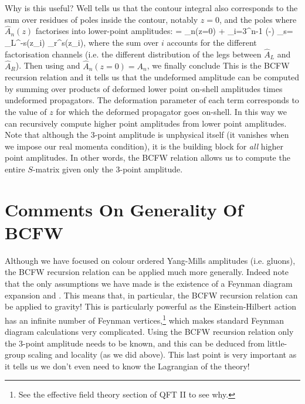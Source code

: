 Why is this useful? Well  tells us that the contour integral also corresponds to the sum over residues of poles inside the contour, notably $z=0$, and the poles where $\widehat{A}_n(z)$ factorises into lower-point amplitudes:
 = _n(z=0) + \sum_{i=3}^{n-1}  \bigg(-\bigg) \sum_{s=} _L^{-s}(z_i) _r^s(z_i),
\ese 
where the sum over $i$ accounts for the different factorisation channels (i.e. the different distribution of the legs between $\widehat{A}_L$ and $\widehat{A}_R$). Then using  and $\widehat{A}_n(z=0) = A_n$, we finally conclude 
\noindent This is the BCFW recursion relation and it tells us that the undeformed amplitude can be computed by summing over products of deformed lower point on-shell amplitudes times undeformed propagators. The deformation parameter of each term corresponds to the value of $z$ for which the deformed propagator goes on-shell. In this way we can recursively compute higher point amplitudes from lower point amplitudes. Note that although the $3$-point amplitude is unphysical itself (it vanishes when we impose our real momenta condition), it is the building block for \textit{all} higher point amplitudes. In other words, the BCFW relation allows us to compute the entire $S$-matrix given only the $3$-point amplitude. 

\section{Comments On Generality Of BCFW}

Although we have focused on colour ordered Yang-Mills amplitudes (i.e. gluons), the BCFW recursion relation can be applied much more generally. Indeed note that the only assumptions we have made is the existence of a Feynman diagram expansion and . This means that, in particular, the BCFW recursion relation can be applied to gravity! This is particularly powerful as the Einstein-Hilbert action has an infinite number of Feynman vertices,\footnote{See the effective field theory section of QFT II to see why.} which makes standard Feynman diagram calculations very complicated. Using the BCFW recursion relation only the $3$-point amplitude needs to be known, and this can be deduced from little-group scaling and locality (as we did above). This last point is very important as it tells us we don't even need to know the Lagrangian of the theory!

